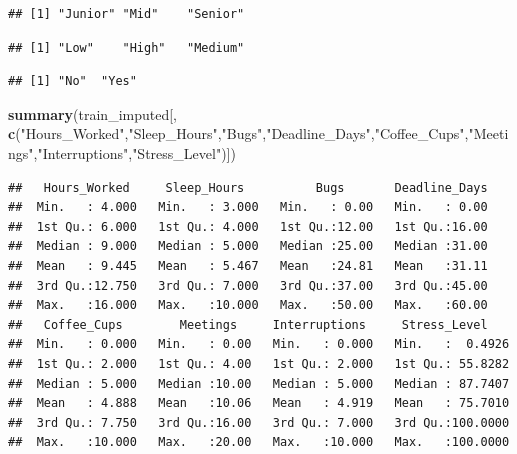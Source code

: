 \documentclass[
]{article}
\newenvironment{Shaded}{\begin{snugshade}}{\end{snugshade}}
\newcommand{\FunctionTok}[1]{\textcolor[rgb]{0.13,0.29,0.53}{\textbf{#1}}}
\newcommand{\NormalTok}[1]{#1}
\newcommand{\SpecialCharTok}[1]{\textcolor[rgb]{0.81,0.36,0.00}{\textbf{#1}}}
\newcommand{\StringTok}[1]{\textcolor[rgb]{0.31,0.60,0.02}{#1}}
\begin{document}
\begin{verbatim}
## [1] "Junior" "Mid"    "Senior"
\end{verbatim}

\begin{Shaded}
\end{Shaded}

\begin{verbatim}
## [1] "Low"    "High"   "Medium"
\end{verbatim}

\begin{Shaded}
\end{Shaded}

\begin{verbatim}
## [1] "No"  "Yes"
\end{verbatim}

\begin{Shaded}
\begin{Highlighting}[]
\FunctionTok{summary}\NormalTok{(train\_imputed[, }\FunctionTok{c}\NormalTok{(}\StringTok{"Hours\_Worked"}\NormalTok{,}\StringTok{"Sleep\_Hours"}\NormalTok{,}\StringTok{"Bugs"}\NormalTok{,}\StringTok{"Deadline\_Days"}\NormalTok{,}\StringTok{"Coffee\_Cups"}\NormalTok{,}\StringTok{"Meetings"}\NormalTok{,}\StringTok{"Interruptions"}\NormalTok{,}\StringTok{"Stress\_Level"}\NormalTok{)])}
\end{Highlighting}
\end{Shaded}

\begin{verbatim}
##   Hours_Worked     Sleep_Hours          Bugs       Deadline_Days  
##  Min.   : 4.000   Min.   : 3.000   Min.   : 0.00   Min.   : 0.00  
##  1st Qu.: 6.000   1st Qu.: 4.000   1st Qu.:12.00   1st Qu.:16.00  
##  Median : 9.000   Median : 5.000   Median :25.00   Median :31.00  
##  Mean   : 9.445   Mean   : 5.467   Mean   :24.81   Mean   :31.11  
##  3rd Qu.:12.750   3rd Qu.: 7.000   3rd Qu.:37.00   3rd Qu.:45.00  
##  Max.   :16.000   Max.   :10.000   Max.   :50.00   Max.   :60.00  
##   Coffee_Cups        Meetings     Interruptions     Stress_Level     
##  Min.   : 0.000   Min.   : 0.00   Min.   : 0.000   Min.   :  0.4926  
##  1st Qu.: 2.000   1st Qu.: 4.00   1st Qu.: 2.000   1st Qu.: 55.8282  
##  Median : 5.000   Median :10.00   Median : 5.000   Median : 87.7407  
##  Mean   : 4.888   Mean   :10.06   Mean   : 4.919   Mean   : 75.7010  
##  3rd Qu.: 7.750   3rd Qu.:16.00   3rd Qu.: 7.000   3rd Qu.:100.0000  
##  Max.   :10.000   Max.   :20.00   Max.   :10.000   Max.   :100.0000
\end{verbatim}
\end{document}
